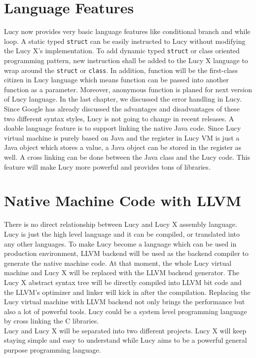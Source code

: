 \section{Language Features}
Lucy now provides very basic language features like conditional branch and while loop. A static typed \texttt{struct} can be easily instructed to Lucy without modifying the Lucy X's implementation. To add dynamic typed \texttt{struct} or class oriented programming pattern, new instruction shall be added to the Lucy X language to wrap around the \texttt{struct} or \texttt{class}. In addition, function will be the first-class citizen in Lucy language which means function can be passed into another function as a parameter. Moreover, anonymous function is planed for next version of Lucy language.
In the last chapter, we discussed the error handling in Lucy. Since Google has already discussed the advantages and disadvantages of these two different syntax styles, Lucy is not going to change in recent releases.
A doable language feature is to support linking the native Java code. Since Lucy virtual machine is purely based on Java and the register in Lucy VM is just a Java object which stores a value, a Java object can be stored in the register as well. A cross linking can be done between the Java class and the Lucy code. This feature will make Lucy more powerful and provides tons of libraries.


\section{Native Machine Code with LLVM}
There is no direct relationship between Lucy and Lucy X assembly language. Lucy is just the high level language and it can be compiled, or translated into any other languages. To make Lucy become a language which can be used in production environment, LLVM backend will be used as the backend compiler to generate the native machine code. At that moment, the whole Lucy virtual machine and Lucy X will be replaced with the LLVM backend generator. The Lucy X abstract syntax tree will be directly compiled into LLVM bit code and the LLVM's optimizer and linker will kick in after the compilation. Replacing the Lucy virtual machine with LLVM backend not only brings the performance but also a lot of powerful tools. Lucy could be a system level programming language by cross linking the C libraries. \\
Lucy and Lucy X will be separated into two different projects. Lucy X will keep staying simple and easy to understand while Lucy aims to be a powerful general purpose programming language. 
